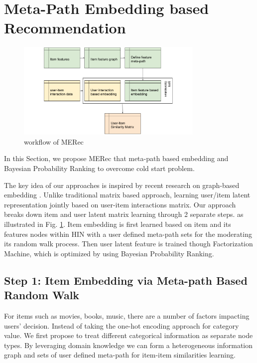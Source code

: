 \section{Meta-Path Embedding based Recommendation}

\begin{figure}[!t]
    \centering
    \includegraphics[width=0.8\textwidth]{figs/fig0.png}
    \caption{workflow of MERec}\label{fig:fe-overview}
\end{figure}

In this Section, we propose MERec that meta-path based embedding and Bayesian Probability Ranking to overcome cold start problem. 

The key idea of our approaches is inspired by recent research on graph-based embedding \cite{dong2017metapath2vec}. Unlike traditional matrix based approach, learning user/item latent representation jointly based on user-item interactions matrix. Our approach breaks down item and user latent matrix learning through 2 separate steps. as illustrated in Fig. \ref{fig:fe-overview}. Item embedding is first learned based on item and its features nodes within HIN with a user defined meta-path sets for the moderating its random walk process. Then user latent feature is trained though Factorization Machine, which is optimized by using Bayesian Probability Ranking.

\subsection{Step 1: Item Embedding via Meta-path Based Random Walk}\label{3MF}

For items such as movies, books, music, there are a number of factors impacting users' decision. Instead of taking the one-hot encoding approach for category value. We first propose to treat different categorical information as separate node types. 
By leveraging domain knowledge we can form a heterogeneous information graph and sets of user defined meta-path for item-item similarities learning. 

